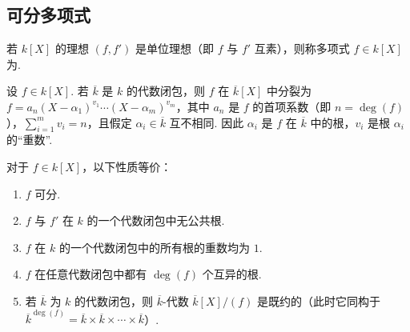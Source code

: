 \subsection{可分多项式}\label{sec:galois-2-5-2}
\begin{definition*}
若 $k[X]$ 的理想 $(f,f')$ 是单位理想（即 $f$ 与 $f'$ 互素），则称多项式 $f\in k[X]$ 为.
\end{definition*}
设 $f\in k[X]$. 若 $\overline k$ 是 $k$ 的代数闭包，则 $f$ 在 $\overline k[X]$ 中分裂为 $f=a_n(X-\alpha_1)^{v_1}\cdots(X-\alpha_m)^{v_m}$，其中 $a_n$ 是 $f$ 的首项系数（即 $n=\deg(f)$），$\sum_{i=1}^m v_i=n$，且假定 $\alpha_i\in\overline k$ 互不相同. 因此 $\alpha_i$ 是 $f$ 在 $\overline k$ 中的根，$v_i$ 是根 $\alpha_i$ 的``重数''.
\begin{proposition*}
对于 $f\in k[X]$，以下性质等价：
\begin{enumerate}[label=\roman*)]
\item $f$ 可分.
\item $f$ 与 $f'$ 在 $k$ 的一个代数闭包中无公共根.
\item $f$ 在 $k$ 的一个代数闭包中的所有根的重数均为 $1$.
\item[iii$'$)] $f$ 在任意代数闭包中都有 $\deg(f)$ 个互异的根.
\item[iii$''$)] 若 $\overline k$ 为 $k$ 的代数闭包，则 $\overline k$-代数 $\overline k[X]/(f)$ 是既约的（此时它同构于 $\overline k^{\deg(f)}=\overline k\times\overline k\times\cdots\times\overline k$）.
\end{enumerate}
\end{proposition*}
